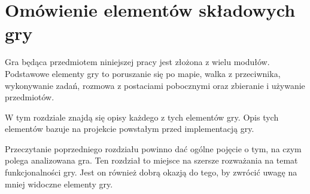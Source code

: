 \chapter{Omówienie elementów składowych gry}
Gra będąca przedmiotem niniejszej pracy jest złożona z wielu modułów.
Podstawowe elementy gry to poruszanie się po mapie, 
walka z przeciwnika, wykonywanie zadań, rozmowa z postaciami pobocznymi oraz 
zbieranie i używanie przedmiotów.

W tym rozdziale znajdą się opisy każdego z tych elementów gry.
Opis tych elementów bazuje na projekcie powstałym przed implementacją gry.

Przeczytanie poprzedniego rozdziału powinno dać ogólne pojęcie o tym, na czym 
polega analizowana gra. Ten rozdział to miejsce na szersze rozważania na temat 
funkcjonalności gry. Jest on również dobrą okazją do tego, by zwrócić uwagę na 
mniej widoczne elementy gry.